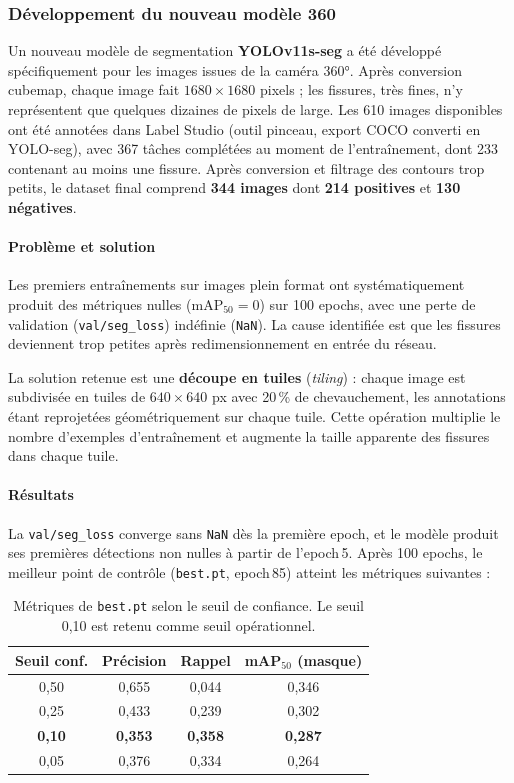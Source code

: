 \documentclass[12pt,a4paper]{article}
\begin{document}
\subsubsection{Développement du nouveau modèle 360}

Un nouveau modèle de segmentation \textbf{YOLOv11s-seg} a été développé spécifiquement pour les images issues de la caméra 360°. Après conversion cubemap, chaque image fait $1680 \times 1680$ pixels ; les fissures, très fines, n'y représentent que quelques dizaines de pixels de large. Les 610 images disponibles ont été annotées dans Label Studio (outil pinceau, export COCO converti en YOLO-seg), avec 367 tâches complétées au moment de l'entraînement, dont 233 contenant au moins une fissure. Après conversion et filtrage des contours trop petits, le dataset final comprend \textbf{344 images} dont \textbf{214 positives} et \textbf{130 négatives}.

\paragraph{Problème et solution}

Les premiers entraînements sur images plein format ont systématiquement produit des métriques nulles ($\text{mAP}_{50} = 0$) sur 100 epochs, avec une perte de validation (\texttt{val/seg\_loss}) indéfinie (\texttt{NaN}). La cause identifiée est que les fissures deviennent trop petites après redimensionnement en entrée du réseau.

La solution retenue est une \textbf{découpe en tuiles} (\textit{tiling}) : chaque image est subdivisée en tuiles de $640 \times 640$ px avec 20\,\% de chevauchement, les annotations étant reprojetées géométriquement sur chaque tuile. Cette opération multiplie le nombre d'exemples d'entraînement et augmente la taille apparente des fissures dans chaque tuile.

\paragraph{Résultats}

La \texttt{val/seg\_loss} converge sans \texttt{NaN} dès la première epoch, et le modèle produit ses premières détections non nulles à partir de l'epoch\,5. Après 100 epochs, le meilleur point de contrôle (\texttt{best.pt}, epoch\,85) atteint les métriques suivantes :

\begin{table}[H]
\centering
\begin{tabular}{cccc}
\hline
\textbf{Seuil conf.} & \textbf{Précision} & \textbf{Rappel} & \textbf{mAP$_{50}$ (masque)} \\
\hline
0,50 & 0,655 & 0,044 & 0,346 \\
0,25 & 0,433 & 0,239 & 0,302 \\
\textbf{0,10} & \textbf{0,353} & \textbf{0,358} & \textbf{0,287} \\
0,05 & 0,376 & 0,334 & 0,264 \\
\hline
\end{tabular}
\caption{Métriques de \texttt{best.pt} selon le seuil de confiance. Le seuil 0,10 est retenu comme seuil opérationnel.}
\label{tab:metrics_conf}
\end{table}
\end{document}
